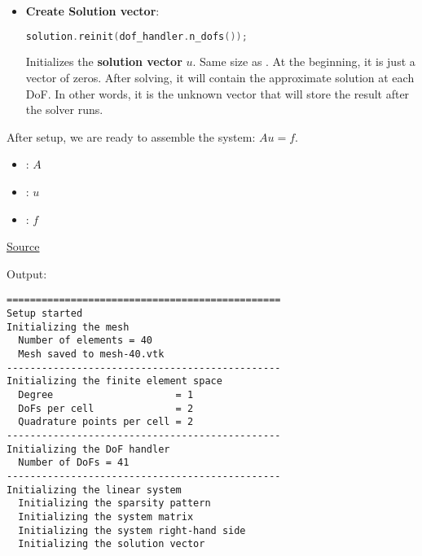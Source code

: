 \begin{enumerate}
\begin{itemize}
        \item \textbf{Create Solution vector}:
        \begin{lstlisting}[language=C++]
solution.reinit(dof_handler.n_dofs());\end{lstlisting}
        Initializes the \textbf{solution vector} $u$. Same size as . At the beginning, it is just a vector of zeros. After solving, it will contain the approximate solution at each DoF. In other words, it is the unknown vector that will store the result after the solver runs.
    \end{itemize}
\end{enumerate}
After setup, we are ready to assemble the system: $Au = f$.
\begin{itemize}
    \item {}: $A$
    \item {}: $u$
    \item {}: $f$
\end{itemize}

\begin{center}
    \href{https://gist.github.com/AndreVale69/f04f312da68d16c253f46493ae7eaf24#file-poisson1d-cpp}{ Source}
    \hspace{1em}
\end{center}

\noindent
Output:
\begin{lstlisting}
===============================================
Setup started
Initializing the mesh
  Number of elements = 40
  Mesh saved to mesh-40.vtk
-----------------------------------------------
Initializing the finite element space
  Degree                     = 1
  DoFs per cell              = 2
  Quadrature points per cell = 2
-----------------------------------------------
Initializing the DoF handler
  Number of DoFs = 41
-----------------------------------------------
Initializing the linear system
  Initializing the sparsity pattern
  Initializing the system matrix
  Initializing the system right-hand side
  Initializing the solution vector\end{lstlisting}